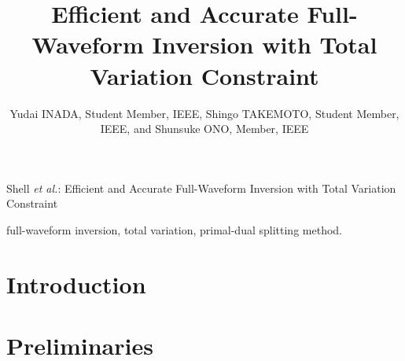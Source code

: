 \documentclass[journal]{IEEEtran}
\begin{document}
    

    \title{Efficient and Accurate Full-Waveform Inversion with Total Variation Constraint}

	\author{
        Yudai INADA, Student Member, IEEE, Shingo TAKEMOTO, Student Member, IEEE, and Shunsuke ONO, Member, IEEE





		
	}

    {Shell \MakeLowercase{\textit{et al.}}: Efficient and Accurate Full-Waveform Inversion with Total Variation Constraint}

    \maketitle

    \begin{abstract}  \end{abstract}

    \begin{IEEEkeywords} full-waveform inversion, total variation, primal-dual splitting method. \end{IEEEkeywords}

    \IEEEpeerreviewmaketitle

    \section{Introduction}      \label{sec:Introduction}    

    \section{Preliminaries}     \label{sec:Preliminaries}   
\end{document}
